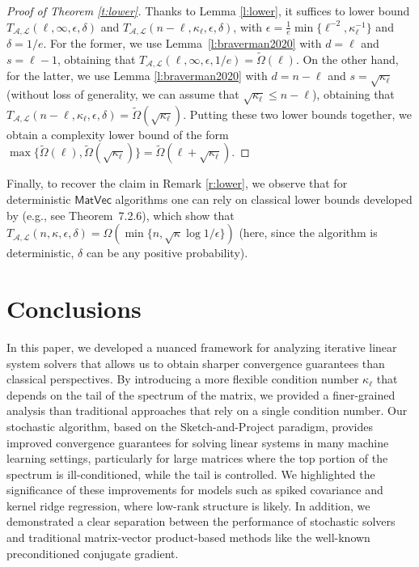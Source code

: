 \documentclass[11pt]{article}
\def\MatVec{{\mathsf{MatVec}}}
\def\Ac{{\mathcal A}}
\def\Lc{{\mathcal L}}
\begin{document}
\begin{proof}[Proof of Theorem \ref{t:lower}]
Thanks to Lemma \ref{l:lower}, it suffices to lower bound $T_{\Ac,\Lc}(\ell,\infty,\epsilon,\delta)$ and $T_{\Ac,\Lc}(n-\ell,\kappa_\ell,\epsilon,\delta)$, with $\epsilon = \frac1e\min\{\ell^{-2},\kappa_\ell^{-1}\}$ and $\delta=1/e$. For the former, we use Lemma~\ref{l:braverman2020} with $d=\ell$ and $s=\ell-1$, obtaining that $T_{\Ac,\Lc}(\ell,\infty,\epsilon,1/e)=\tilde\Omega(\ell)$. On the other hand, for the latter, we use Lemma \ref{l:braverman2020} with $d=n-\ell$ and $s=\sqrt{\kappa_\ell}$ (without loss of generality, we can assume that $\sqrt{\kappa_\ell}\leq n-\ell$), obtaining that $T_{\Ac,\Lc}(n-\ell,\kappa_\ell,\epsilon,\delta)=\tilde\Omega(\sqrt{\kappa_\ell})$. Putting these two lower bounds together, we obtain a complexity lower bound of the form $\max\{\tilde\Omega(\ell),\tilde\Omega(\sqrt{\kappa_\ell})\}=\tilde\Omega(\ell+\sqrt{\kappa_\ell})$.
\end{proof}
\smallskip

\noindent
Finally, to recover the claim in Remark \ref{r:lower}, we observe that for deterministic $\MatVec$ algorithms one can rely on classical lower bounds developed by \cite{nemirovsky1983wiley} (e.g., see Theorem~7.2.6), which show that $T_{\Ac,\Lc}(n,\kappa,\epsilon,\delta) = \Omega(\min\{n, \sqrt\kappa\log1/\epsilon\})$ (here, since the algorithm is deterministic, $\delta$ can be any positive probability).




\section{Conclusions}
In this paper, we developed a nuanced framework for analyzing iterative linear system solvers that allows us to obtain sharper convergence guarantees than classical perspectives. By introducing a more flexible condition number $\kappa_\ell$ that depends on the tail of the spectrum of the matrix, we provided a finer-grained analysis than traditional approaches that rely on a single condition number. Our stochastic algorithm, based on the Sketch-and-Project paradigm, provides improved convergence guarantees for solving linear systems in many machine learning settings, particularly for large matrices where the top portion of the spectrum is ill-conditioned, while the tail is controlled.
 We highlighted the significance of these improvements for models such as spiked covariance and kernel ridge regression, where low-rank structure is likely. In addition, we demonstrated a clear separation between the performance of stochastic solvers and traditional matrix-vector product-based methods like the well-known preconditioned conjugate gradient.
\end{document}
